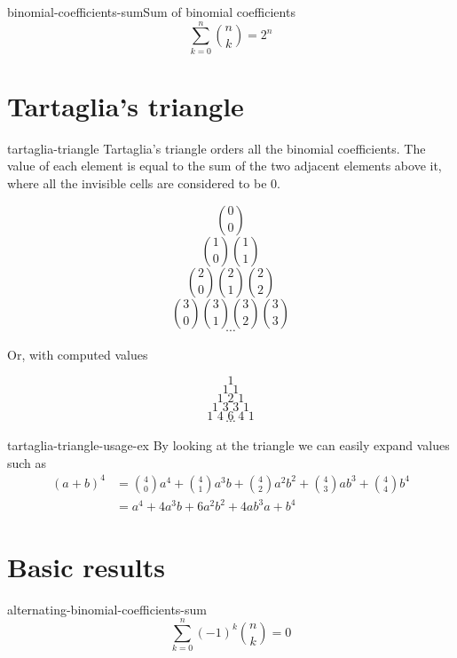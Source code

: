 \documentclass[preview]{standalone}
\begin{document}
\begin{snippetcorollary}{binomial-coefficients-sum}{Sum of binomial coefficients}
    \[
        \sum_{k=0}^n \binom{n}{k} = 2^n
    \]
\end{snippetcorollary}

\section{Tartaglia's triangle}

\begin{snippet}{tartaglia-triangle}
    Tartaglia's triangle orders all the binomial coefficients.
    The value of each element is equal to the sum of the two adjacent elements above it,
    where all the invisible cells are considered to be \(0\).

    \[ \binom{0}{0} \]
    \[ \binom{1}{0} \binom{1}{1} \]
    \[ \binom{2}{0} \binom{2}{1} \binom{2}{2} \]
    \[ \binom{3}{0} \binom{3}{1} \binom{3}{2} \binom{3}{3} \]
    \[ \cdots \]

    Or, with computed values

    \[ 1 \]
    \[ 1\,\,1 \]
    \[ 1\,\,2\,\,1 \]
    \[ 1\,\,3\,\,3\,\,1 \]
    \[ 1\,\,4\,\,6\,\,4\,\,1 \]
    \[ \cdots \]
\end{snippet}

\begin{snippet}{tartaglia-triangle-usage-ex}
    By looking at the triangle we can easily expand values such as
    \begin{align}
        {(a+b)}^4 &= \binom{4}{0}a^4 + \binom{4}{1}a^3b + \binom{4}{2}a^2b^2+ \binom{4}{3}ab^3 + \binom{4}{4} b^4 \\
        &= a^4 + 4a^3b + 6a^2b^2 + 4ab^3a + b^4
    \end{align}
\end{snippet}

\section{Basic results}

\begin{snippetproposition}{alternating-binomial-coefficients-sum}{}
    \[
        \sum_{k=0}^n {(-1)}^k \binom{n}{k} = 0
    \]
\end{snippetproposition}
\end{document}
